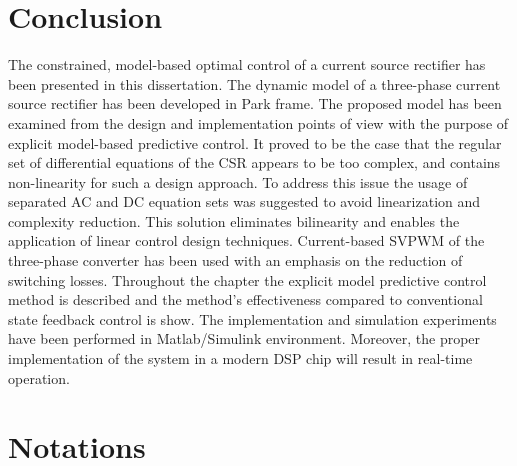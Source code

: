 \section{Conclusion}\label{EMPC:sec:Conclusions}

    The constrained, model-based optimal control of a current source rectifier has been presented in this dissertation. The dynamic model of a three-phase current source rectifier has been developed in Park frame. The proposed model has been examined from the design and implementation points of view with the purpose of explicit model-based predictive control. It proved to be the case that the regular set of differential equations of the CSR appears to be too complex, and contains non-linearity for such a design approach. To address this issue the usage of separated AC and DC equation sets was suggested to avoid linearization and complexity reduction. This solution eliminates bilinearity and enables the application of linear control design techniques. Current-based SVPWM of the three-phase converter has been used with an emphasis on the reduction of switching losses. Throughout the chapter the explicit model predictive control method is described and the method's effectiveness compared to conventional state feedback control is show. The implementation and simulation experiments have been performed in Matlab/Simulink environment. Moreover, the proper implementation of the system in a modern DSP chip will result in real-time operation.
		
		\section{Notations}
		
